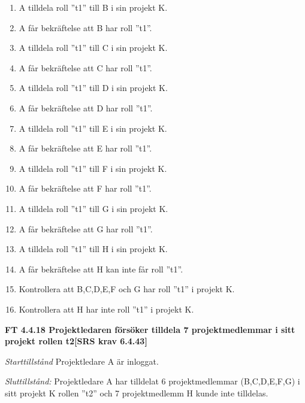 \documentclass[a4paper]{article}
\begin{document}
\begin{enumerate}
\item A tilldela roll ”t1” till B i sin projekt K. 
\item  A får bekräftelse att B har roll ”t1”.
\item A tilldela roll ”t1” till C i sin projekt K. 
\item A får bekräftelse att C har roll ”t1”.
\item A tilldela roll ”t1” till D i sin projekt K. 
\item A får bekräftelse att D har roll ”t1”.
\item A tilldela roll ”t1” till E i sin projekt K. 
\item A får bekräftelse att E har roll ”t1”.
\item A tilldela roll ”t1” till F i sin projekt K.
\item A får bekräftelse att F har roll ”t1”.
\item A tilldela roll ”t1” till G i sin projekt K. 
\item A får bekräftelse att G har roll ”t1”.
\item A tilldela roll ”t1” till H i sin projekt K. 
\item A får bekräftelse att  H kan inte får roll ”t1”.
\item Kontrollera att B,C,D,E,F och G har roll ”t1” i projekt K.
\item Kontrollera att H har inte roll ”t1” i projekt K.
\end{enumerate}

\textbf{FT 4.4.18 Projektledaren försöker tilldela 7 projektmedlemmar i sitt projekt rollen t2[SRS krav 6.4.43]}

\emph{Starttillstånd} Projektledare A är inloggat.

\emph{Sluttillstånd:} Projektledare A  har tilldelat 6 projektmedlemmar (B,C,D,E,F,G) i sitt projekt K  rollen ''t2'' och 7 projektmedlemm H kunde inte tilldelas.
\end{document}
